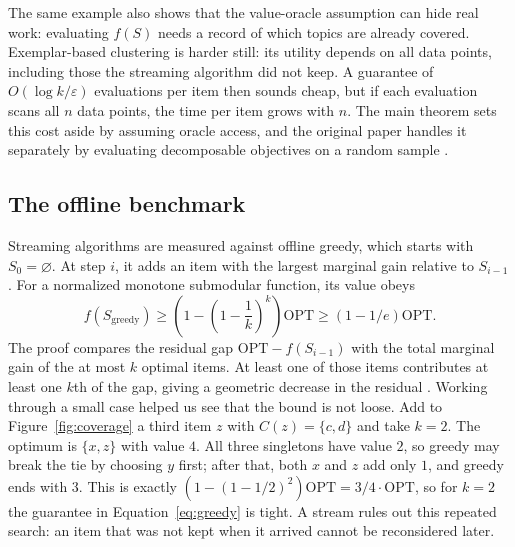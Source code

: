 \documentclass[10pt]{article}
\newcommand{\OPT}{\mathrm{OPT}}
\begin{document}
The same example also shows that the value-oracle assumption can hide real work: evaluating $f(S)$ needs a record of which topics are already covered. Exemplar-based clustering is harder still: its utility depends on all data points, including those the streaming algorithm did not keep. A guarantee of $O(\log k/\varepsilon)$ evaluations per item then sounds cheap, but if each evaluation scans all $n$ data points, the time per item grows with $n$. The main theorem sets this cost aside by assuming oracle access, and the original paper handles it separately by evaluating decomposable objectives on a random sample \cite{badanidiyuru2014streaming}.

\subsection{The offline benchmark}
\label{sec:benchmark}
Streaming algorithms are measured against offline greedy, which starts with $S_0=\varnothing$. At step $i$, it adds an item with the largest marginal gain relative to $S_{i-1}$. For a normalized monotone submodular function, its value obeys
\begin{equation}
  f(S_{\mathrm{greedy}})\geq
  \left(1-\left(1-\frac{1}{k}\right)^k\right)\OPT
  \geq (1-1/e)\OPT.
  \label{eq:greedy}
\end{equation}
The proof compares the residual gap $\OPT-f(S_{i-1})$ with the total marginal gain of the at most $k$ optimal items. At least one of those items contributes at least one $k$th of the gap, giving a geometric decrease in the residual \cite{nemhauser1978analysis}. Working through a small case helped us see that the bound is not loose. Add to Figure~\ref{fig:coverage} a third item $z$ with $C(z)=\{c,d\}$ and take $k=2$. The optimum is $\{x,z\}$ with value $4$. All three singletons have value $2$, so greedy may break the tie by choosing $y$ first; after that, both $x$ and $z$ add only $1$, and greedy ends with $3$. This is exactly $(1-(1-1/2)^2)\OPT=3/4\cdot\OPT$, so for $k=2$ the guarantee in Equation~\eqref{eq:greedy} is tight. A stream rules out this repeated search: an item that was not kept when it arrived cannot be reconsidered later.
\end{document}
